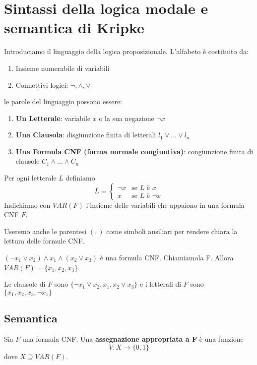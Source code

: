 \documentclass[10pt,a4paper,twoside]{book}
\begin{document}
\section{Sintassi della logica modale e semantica di Kripke}
Introduciamo il linguaggio della logica proposizionale. L'alfabeto è costituito da:
\begin{enumerate}
    \item Insieme numerabile di variabili
    \item Connettivi logici: $\neg, \land, \lor$
\end{enumerate}
le parole del linguaggio possono essere:
\begin{enumerate}
    \item \textbf{Un Letterale}: variabile $x$ o la sua negazione $\neg x$
    \item \textbf{Una Clausola}: disgiunzione finita di letterali $l_1 \lor \ldots \lor l_n$
    \item \textbf{Una Formula CNF (forma normale congiuntiva)}: congiunzione finita di clausole $C_1 \land \ldots \land C_n$
\end{enumerate}
Per ogni letterale $L$ definiamo
\begin{equation*}
    \overline{L} = \begin{cases}
        \neg x & \text{se } L \text{ è } x      \\
        x      & \text{se } L \text{ è } \neg x
    \end{cases}
\end{equation*}
Indichiamo con $VAR(F)$ l'insieme delle variabili che appaiono in una formula CNF $F$.

Useremo anche le parentesi $(,)$ come simboli ausiliari per rendere chiara la lettura delle formule CNF.
\begin{example}
    $(\neg x_1 \lor x_2) \land x_1 \land (x_2 \lor x_3)$ è una formula CNF. Chiamiamola F. Allora $VAR(F)=\{x_1,x_2,x_3\}$.

    Le clausole di $F$ sono $\{\neg x_1 \lor x_2, x_1, x_2 \lor x_3\}$ e i letterali di $F$ sono $\{x_1, x_2, x_3, \neg x_1 \}$
\end{example}

\subsection{Semantica}
\begin{definition}
    Sia $F$ una formula CNF. Una \textbf{assegnazione appropriata a F} è una funzione
    \begin{equation*}
        V: X \rightarrow \{0,1\}
    \end{equation*}
    dove $X \supseteq VAR(F)$.
\end{definition}
\end{document}
